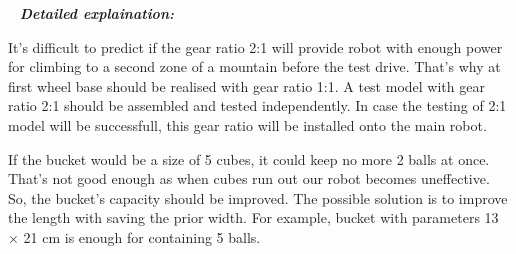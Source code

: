    \newline
  \textit{\textbf{Detailed explaination:}}
  \begin{enumerate*}
  	\item It's difficult to predict if the gear ratio 2:1 will provide robot with enough power for climbing to a second zone of a mountain before the test drive. That's why at first wheel base should be realised with gear ratio 1:1. A test model with gear ratio 2:1 should be assembled and tested independently. In case the testing of 2:1 model will be successfull, this gear ratio will be installed onto the main robot.
  	\begin{figure}[H]
  		\begin{minipage}[h]{1\linewidth}
  			\caption{}
  		\end{minipage}
  	\end{figure}
  	
  	\item If the bucket would be a size of 5 cubes, it could keep no more 2 balls at once. That's not good enough as when cubes run out our robot becomes uneffective. So, the bucket's capacity should be improved. The possible solution is to improve the length with saving the prior width. For example, bucket with parameters 13 $\times$ 21 cm is enough for containing 5 balls.
  	\begin{figure}[H]
  		\begin{minipage}[h]{1\linewidth}
  			\caption{}
  		\end{minipage}
  	\end{figure}
  	

\end{enumerate*}
